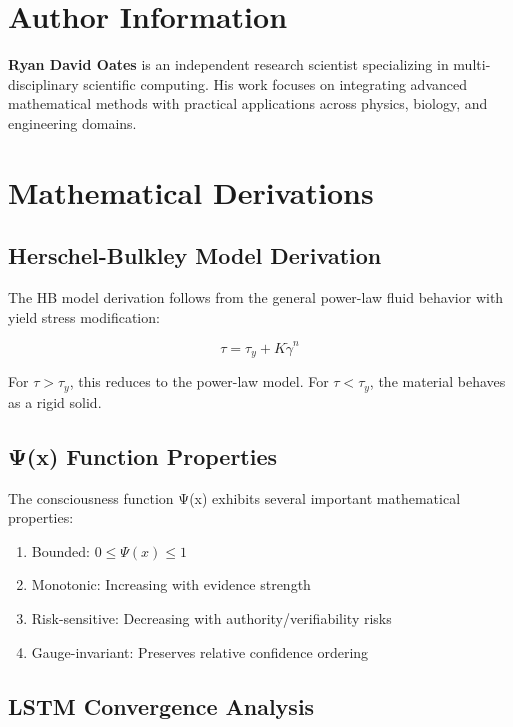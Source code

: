 \documentclass[11pt,a4paper]{article}
\begin{document}
\section*{Author Information}

\textbf{Ryan David Oates} is an independent research scientist specializing in multi-disciplinary scientific computing. His work focuses on integrating advanced mathematical methods with practical applications across physics, biology, and engineering domains.

\appendix

\section{Mathematical Derivations}
\label{app:math}

\subsection{Herschel-Bulkley Model Derivation}

The HB model derivation follows from the general power-law fluid behavior with yield stress modification:

\begin{equation}
\tau = \tau_y + K\dot{\gamma}^n
\end{equation}

For $\tau > \tau_y$, this reduces to the power-law model. For $\tau < \tau_y$, the material behaves as a rigid solid.

\subsection{Ψ(x) Function Properties}

The consciousness function Ψ(x) exhibits several important mathematical properties:

\begin{enumerate}
    \item Bounded: $0 \leq \Psi(x) \leq 1$
    \item Monotonic: Increasing with evidence strength
    \item Risk-sensitive: Decreasing with authority/verifiability risks
    \item Gauge-invariant: Preserves relative confidence ordering
\end{enumerate}

\subsection{LSTM Convergence Analysis}
\end{document}
